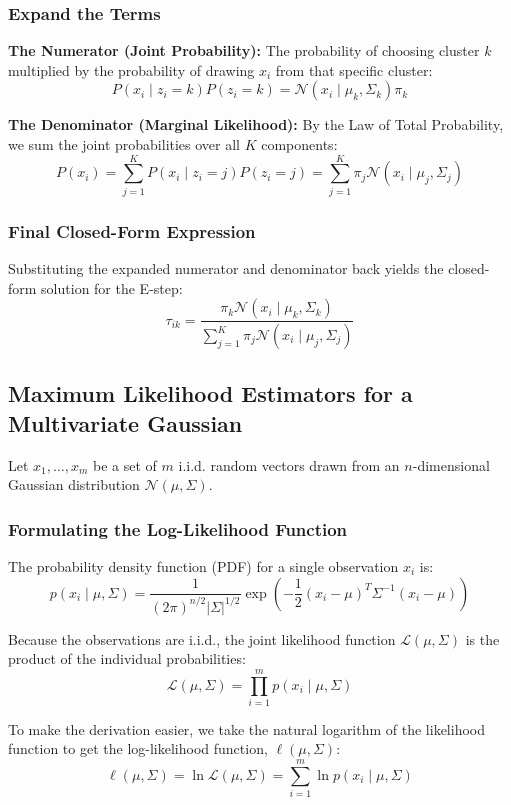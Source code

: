 \documentclass[twoside, 10pt]{article}
\begin{document}
\subsubsection{Expand the Terms} %
\textbf{The Numerator (Joint Probability):} The probability of choosing cluster $k$ multiplied by the probability of drawing $x_i$ from that specific cluster:
\[P(x_i \mid z_i = k) P(z_i = k) = \mathcal{N}(x_i \mid \mu_k, \Sigma_k) \pi_k\]

\textbf{The Denominator (Marginal Likelihood):} By the Law of Total Probability, we sum the joint probabilities over all $K$ components:
\[P(x_i) = \sum_{j=1}^K P(x_i \mid z_i = j) P(z_i = j) = \sum_{j=1}^K \pi_j \mathcal{N}(x_i \mid \mu_j, \Sigma_j)\]

\subsubsection{Final Closed-Form Expression}
Substituting the expanded numerator and denominator back yields the closed-form solution for the E-step:
\[\tau_{ik} = \frac{\pi_k \mathcal{N}(x_i \mid \mu_k, \Sigma_k)}{\sum_{j=1}^K \pi_j \mathcal{N}(x_i \mid \mu_j, \Sigma_j)}\]

\subsection{Maximum Likelihood Estimators for a Multivariate Gaussian} %
Let $x_1, \dots, x_m$ be a set of $m$ i.i.d. random vectors drawn from an $n$-dimensional Gaussian distribution $\mathcal{N}(\mu, \Sigma)$.

\subsubsection{Formulating the Log-Likelihood Function}
The probability density function (PDF) for a single observation $x_i$ is:
\[
 p(x_i \mid \mu, \Sigma) = \frac{1}{(2\pi)^{n/2}|\Sigma|^{1/2}} \exp\left( -\frac{1}{2}(x_i - \mu)^T\Sigma^{-1}(x_i - \mu) \right)
\]

Because the observations are i.i.d., the joint likelihood function $\mathcal{L}(\mu, \Sigma)$ is the product of the individual probabilities:
\[
 \mathcal{L}(\mu, \Sigma) = \prod_{i=1}^m p(x_i \mid \mu, \Sigma)
\]

To make the derivation easier, we take the natural logarithm of the likelihood function to get the log-likelihood function, $\ell(\mu, \Sigma)$:
\[
 \ell(\mu, \Sigma) = \ln \mathcal{L}(\mu, \Sigma) = \sum_{i=1}^m \ln p(x_i \mid \mu, \Sigma)
\]
\end{document}
